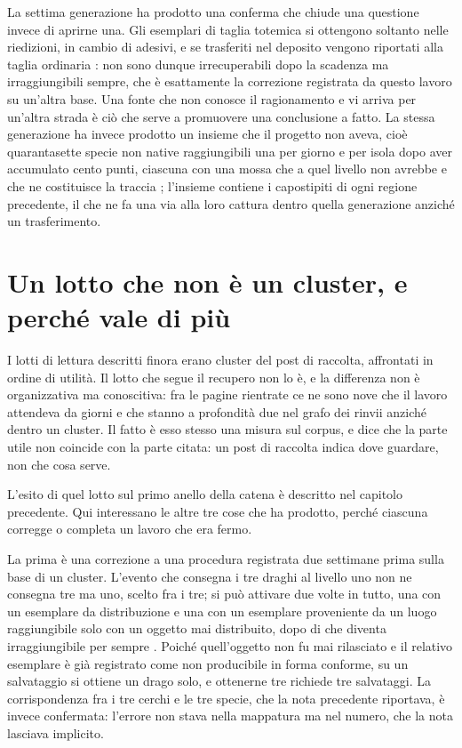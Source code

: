 La settima generazione ha prodotto una conferma che chiude una questione invece di aprirne una. Gli esemplari di taglia totemica si ottengono soltanto nelle riedizioni, in cambio di adesivi, e se trasferiti nel deposito vengono riportati alla taglia ordinaria \cite{bulbapedia-totem}: non sono dunque irrecuperabili dopo la scadenza ma irraggiungibili sempre, che è esattamente la correzione registrata da questo lavoro su un'altra base. Una fonte che non conosce il ragionamento e vi arriva per un'altra strada è ciò che serve a promuovere una conclusione a fatto. La stessa generazione ha invece prodotto un insieme che il progetto non aveva, cioè quarantasette specie non native raggiungibili una per giorno e per isola dopo aver accumulato cento punti, ciascuna con una mossa che a quel livello non avrebbe e che ne costituisce la traccia \cite{bulbapedia-island-scan}; l'insieme contiene i capostipiti di ogni regione precedente, il che ne fa una via alla loro cattura dentro quella generazione anziché un trasferimento.

\section{Un lotto che non è un cluster, e perché vale di più}

I lotti di lettura descritti finora erano cluster del post di raccolta, affrontati in ordine di utilità. Il lotto che segue il recupero non lo è, e la differenza non è organizzativa ma conoscitiva: fra le pagine rientrate ce ne sono nove che il lavoro attendeva da giorni e che stanno a profondità due nel grafo dei rinvii anziché dentro un cluster. Il fatto è esso stesso una misura sul corpus, e dice che la parte utile non coincide con la parte citata: un post di raccolta indica dove guardare, non che cosa serve.

L'esito di quel lotto sul primo anello della catena è descritto nel capitolo precedente. Qui interessano le altre tre cose che ha prodotto, perché ciascuna corregge o completa un lavoro che era fermo.

La prima è una correzione a una procedura registrata due settimane prima sulla base di un cluster. L'evento che consegna i tre draghi al livello uno non ne consegna tre ma uno, scelto fra i tre; si può attivare due volte in tutto, una con un esemplare da distribuzione e una con un esemplare proveniente da un luogo raggiungibile solo con un oggetto mai distribuito, dopo di che diventa irraggiungibile per sempre \cite{bulbapedia-sinjoh}. Poiché quell'oggetto non fu mai rilasciato e il relativo esemplare è già registrato come non producibile in forma conforme, su un salvataggio si ottiene un drago solo, e ottenerne tre richiede tre salvataggi. La corrispondenza fra i tre cerchi e le tre specie, che la nota precedente riportava, è invece confermata: l'errore non stava nella mappatura ma nel numero, che la nota lasciava implicito.

